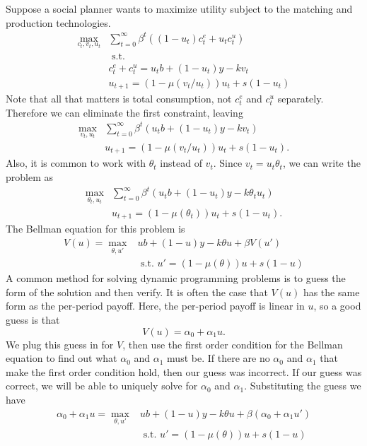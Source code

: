 \documentclass[12pt,reqno]{amsart}
\theoremstyle{definition}
\begin{document}
Suppose a social planner wants to maximize utility subject to the
matching and production technologies. 
\begin{align*}
  \max_{c_t,v_t,u_t} & \sum_{t=0}^\infty \beta^t \left( (1-u_t)c_t^e + u_t
    c_t^u\right) \\
  & \text{ s.t.} \\
  & c_t^e + c_t^u = u_t b + (1-u_t) y - k v_t \\
  & u_{t+1} = (1-\mu(v_t/u_t)) u_t + s (1-u_t) 
\end{align*}
Note that all that matters is total consumption, not $c_t^e$ and
$c_t^u$ separately. Therefore we can eliminate the first constraint, leaving
\begin{align*}
  \max_{v_t,u_t} & \sum_{t=0}^\infty \beta^t \left(u_t b + (1-u_t)
    y - k v_t\right) \\ 
  & u_{t+1} = (1-\mu(v_t/u_t)) u_t + s (1-u_t).
\end{align*}
Also, it is common to work with $\theta_t$ instead of $v_t$. Since
$v_t = u_t \theta_t$, we can write the problem as
\begin{align*}
  \max_{\theta_t,u_t} & \sum_{t=0}^\infty \beta^t \left(u_t b + (1-u_t)
    y - k \theta_t u_t\right) \\ 
  & u_{t+1} = (1-\mu(\theta_t)) u_t + s (1-u_t).
\end{align*}
The Bellman equation for this problem is
\begin{align*}
  V(u) = \max_{\theta,u'} & u b + (1-u) y - k \theta u + \beta V(u') \\
  & \text{ s.t. } u' = (1-\mu(\theta)) u + s(1-u)
\end{align*}
A common method for solving dynamic programming problems is to guess
the form of the solution and then verify. It is often the case that
$V(u)$ has the same form as the per-period payoff. Here, the
per-period payoff is linear in $u$, so a good guess is that 
\[ V(u) = \alpha_0 + \alpha_1 u. \]
We plug this guess in for $V$, then use the first order condition for
the Bellman equation to find out what $\alpha_0$ and $\alpha_1$ must
be. If there are no $\alpha_0$ and $\alpha_1$ that make the first
order condition hold, then our guess was incorrect. If our guess was
correct, we will be able to uniquely solve for $\alpha_0$ and
$\alpha_1$. Substituting the guess we have
\begin{align*}
  \alpha_0 + \alpha_1 u = \max_{\theta,u'} & u b + (1-u) y - k \theta
  u + \beta \left(\alpha_0 + \alpha_1 u' \right) \\ 
  & \text{ s.t. } u' = (1-\mu(\theta)) u + s(1-u)
\end{align*}
\end{document}
